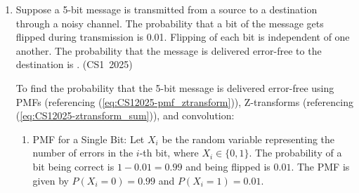 \begin{enumerate}[label=\thesubsection.\arabic*, ref=\thesubsection.\theenumi]
\vspace{0.2cm}
\begin{center}

\end{center}

\begin{center}

\end{center}

\begin{center}

\end{center}

\begin{center}

\end{center}

\vspace{0.3cm}
\begin{lstlisting}[language=SQL]
SELECT MIN (P.age)
FROM player P
WHERE P.pid IN (
    SELECT M.pid
    FROM team T, coach C, members M
    WHERE C.cname = 'Mark'
      AND T.cid = C.cid
      AND M.tid = T.tid
)
\end{lstlisting}
The value returned by the given SQL query is \underline{\hspace{1cm}}.
\hfill (CS1~2025)

\vspace{0.2cm}
\solution
Coach 'Mark' has \texttt{cid = 102}, corresponding to team \texttt{tid = 10}. Players in team 10 are \texttt{pid = 1} (age 31) and \texttt{pid = 3} (age 26). The minimum age is $\min(31, 26) = 26$.

\vspace{0.5cm}
\item Suppose a 5-bit message is transmitted from a source to a destination through a noisy channel. The probability that a bit of the message gets flipped during transmission is 0.01. Flipping of each bit is independent of one another. The probability that the message is delivered error-free to the destination is \underline{\hspace{1cm}}.
\hfill (CS1~2025)

\vspace{0.2cm}
\solution
To find the probability that the 5-bit message is delivered error-free using PMFs (referencing (\ref{eq:CS12025-pmf_ztransform})), Z-transforms (referencing (\ref{eq:CS12025-ztransform_sum})), and convolution:

\begin{enumerate}
    \item PMF for a Single Bit:
    Let $X_i$ be the random variable representing the number of errors in the $i$-th bit, where $X_i \in \{0, 1\}$. The probability of a bit being correct is $1 - 0.01 = 0.99$ and being flipped is $0.01$. The PMF is given by $P(X_i = 0) = 0.99$ and $P(X_i = 1) = 0.01$.


\end{enumerate}
\end{enumerate}
